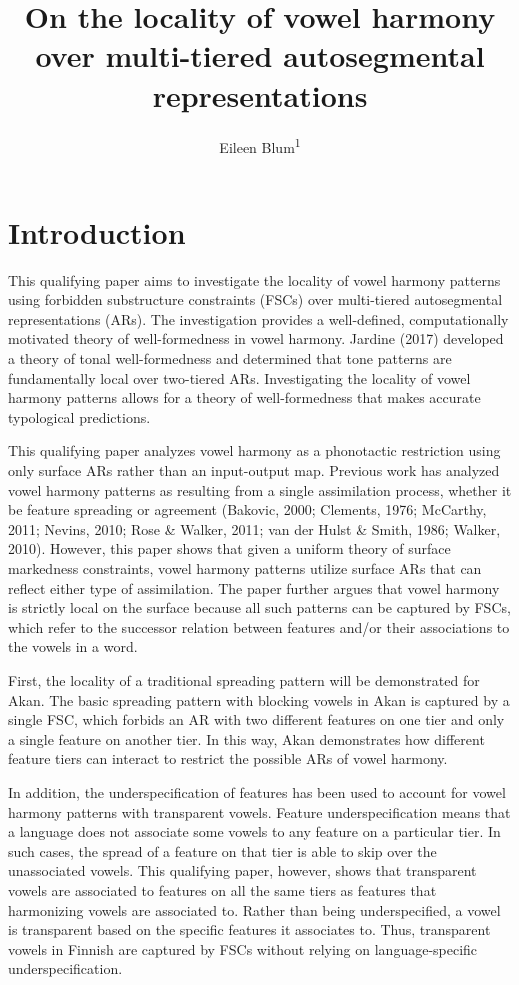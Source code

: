 \documentclass[,doc,floatsintext]{apa6}
\title{On the locality of vowel harmony over multi-tiered autosegmental
representations}
\author{Eileen Blum\textsuperscript{1}}
\date{}
\affiliation{
\vspace{0.5cm}
\textsuperscript{1} Rutgers University}
\theoremstyle{definition}
\theoremstyle{definition}
\theoremstyle{definition}
\theoremstyle{remark}
\begin{document}
\maketitle

\section{Introduction}\label{introduction}

This qualifying paper aims to investigate the locality of vowel harmony
patterns using forbidden substructure constraints (FSCs) over
multi-tiered autosegmental representations (ARs). The investigation
provides a well-defined, computationally motivated theory of
well-formedness in vowel harmony. Jardine (2017) developed a theory of
tonal well-formedness and determined that tone patterns are
fundamentally local over two-tiered ARs. Investigating the locality of
vowel harmony patterns allows for a theory of well-formedness that makes
accurate typological predictions.

This qualifying paper analyzes vowel harmony as a phonotactic
restriction using only surface ARs rather than an input-output map.
Previous work has analyzed vowel harmony patterns as resulting from a
single assimilation process, whether it be feature spreading or
agreement (Bakovic, 2000; Clements, 1976; McCarthy, 2011; Nevins, 2010;
Rose \& Walker, 2011; van der Hulst \& Smith, 1986; Walker, 2010).
However, this paper shows that given a uniform theory of surface
markedness constraints, vowel harmony patterns utilize surface ARs that
can reflect either type of assimilation. The paper further argues that
vowel harmony is strictly local on the surface because all such patterns
can be captured by FSCs, which refer to the successor relation between
features and/or their associations to the vowels in a word.

First, the locality of a traditional spreading pattern will be
demonstrated for Akan. The basic spreading pattern with blocking vowels
in Akan is captured by a single FSC, which forbids an AR with two
different features on one tier and only a single feature on another
tier. In this way, Akan demonstrates how different feature tiers can
interact to restrict the possible ARs of vowel harmony.

In addition, the underspecification of features has been used to account
for vowel harmony patterns with transparent vowels. Feature
underspecification means that a language does not associate some vowels
to any feature on a particular tier. In such cases, the spread of a
feature on that tier is able to skip over the unassociated vowels. This
qualifying paper, however, shows that transparent vowels are associated
to features on all the same tiers as features that harmonizing vowels
are associated to. Rather than being underspecified, a vowel is
transparent based on the specific features it associates to. Thus,
transparent vowels in Finnish are captured by FSCs without relying on
language-specific underspecification.
\end{document}
